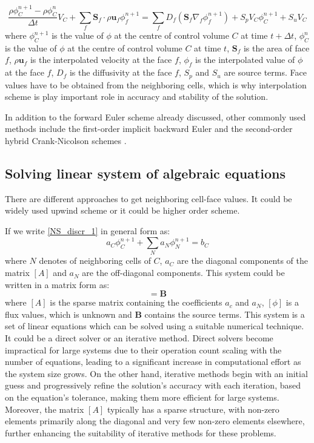\begin{equation} \label{NS_discr_1}
\frac{\rho\phi^{n+1}_C - \rho\phi^{n}_C}{\Delta t} V_{C}+\sum_{f} \mathbf{S}_{f} \cdot \rho\mathbf{u}_{f}\phi_f^{n+1} =\sum_{f} D_f\left(\mathbf{S}_{f} \nabla_{f} \phi_f^{n+1}\right)+ S_p V_C\phi^{n+1}_C +S_u V_C
\end{equation}
where $\phi^{n+1}_C$ is the value of $\phi$ at the centre of control volume $C$ at time $t+\Delta t$, $\phi^{n}_C$ is the value of $\phi$ at the centre of control volume $C$ at time $t$, $\mathbf{S}_{f}$ is the area of face $f$, $\rho\mathbf{u}_{f}$ is the interpolated velocity at the face $f$, $\phi_f$ is the interpolated value of $\phi$ at the face $f$, $D_f$ is the diffusivity at the face $f$, $S_p$ and $S_u$ are source terms. Face values have to be obtained from the neighboring cells, which is why interpolation scheme is play important role in accuracy and stability of the solution.

In addition to the forward Euler scheme already discussed, other commonly used methods include the first-order implicit backward Euler and the second-order hybrid Crank-Nicolson schemes \cite{sun2006efficient}.

\subsection{Solving linear system of algebraic equations}
There are different approaches to get neighboring cell-face values. It could be widely used upwind scheme \cite{leonard1979stable} or it could be higher order scheme.

If we write \ref{NS_discr_1} in general form as:
\begin{equation}
a_{C} \phi_{C}^{n+1}+\sum_{N} a_{N} \phi_{N}^{n+1}=b_{C}
\end{equation}
where $N$ denotes of neighboring cells of $C$,  $a_C$ are the diagonal components of the matrix $[A]$ and $a_N$ are the off-diagonal components. This system could be written in a matrix form as:
\begin{equation}
[A][\phi]=\mathbf{B}
\end{equation}
where $[A]$ is the sparse matrix containing the coefficients $a_c$ and $a_N$, $[\phi]$ is a flux values, which is unknown and $\mathbf{B}$ contains the source terms. This system is a set of linear equations which can be solved using a suitable numerical technique. It could be a direct solver or an iterative method. Direct solvers become impractical for large systems due to their operation count scaling with the number of equations, leading to a significant increase in computational effort as the system size grows. On the other hand, iterative methods begin with an initial guess and progressively refine the solution's accuracy with each iteration, based on the equation's tolerance, making them more efficient for large systems. Moreover, the matrix $[A]$ typically has a sparse structure, with non-zero elements primarily along the diagonal and very few non-zero elements elsewhere, further enhancing the suitability of iterative methods for these problems.

